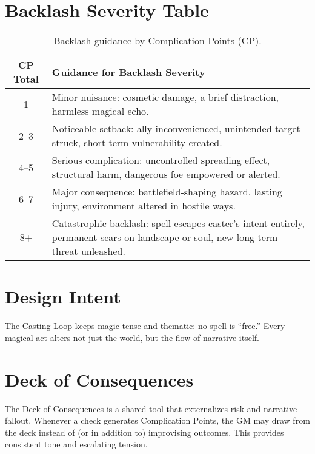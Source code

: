 \documentclass[12pt]{article}
\begin{document}
\section{Backlash Severity Table}

\begin{table}[h!]
\centering
\begin{tabular}{|c|p{10cm}|}
\hline
\textbf{CP Total} & \textbf{Guidance for Backlash Severity} \\
\hline
1 & Minor nuisance: cosmetic damage, a brief distraction, harmless magical echo. \\
\hline
2--3 & Noticeable setback: ally inconvenienced, unintended target struck, short-term vulnerability created. \\
\hline
4--5 & Serious complication: uncontrolled spreading effect, structural harm, dangerous foe empowered or alerted. \\
\hline
6--7 & Major consequence: battlefield-shaping hazard, lasting injury, environment altered in hostile ways. \\
\hline
8+ & Catastrophic backlash: spell escapes caster’s intent entirely, permanent scars on landscape or soul, new long-term threat unleashed. \\
\hline
\end{tabular}
\caption{Backlash guidance by Complication Points (CP).}
\end{table}

\section{Design Intent}
The Casting Loop keeps magic tense and thematic: no spell is “free.”  
Every magical act alters not just the world, but the flow of narrative itself.

\section{Deck of Consequences}

The Deck of Consequences is a shared tool that externalizes risk and narrative fallout. 
Whenever a check generates Complication Points, the GM may draw from the deck instead of (or in addition to) improvising outcomes. 
This provides consistent tone and escalating tension.
\end{document}
